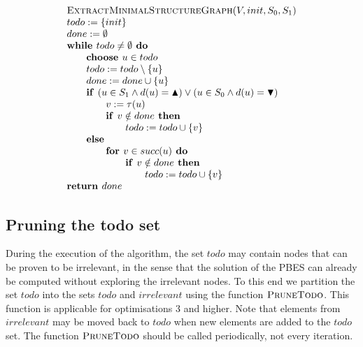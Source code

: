 \documentclass{article}
\newcommand{\If}{\text{\textbf{if }}}
\newcommand{\Do}{\text{\textbf{ do }}}
\newcommand{\Then}{\text{\textbf{ then }}}
\newcommand{\Else}{\text{\textbf{else }}}
\newcommand{\For}{\text{\textbf{for }}}
\newcommand{\While}{\text{\textbf{while }}}
\newcommand{\Choose}{\text{\textbf{choose }}}
\newcommand{\Return}{\text{\textbf{return }}}
\begin{document}
\begin{equation*}
\begin{array}{l}
\textsc{ExtractMinimalStructureGraph}(V,init,S_0,S_1)\\
todo := \{ init \} \\
done := \emptyset \\
\While todo \neq \emptyset \Do \\
\qquad \Choose u \in todo \\
\qquad todo := todo \setminus \{ u \} \\
\qquad done := done \cup \{ u \} \\
\qquad \If (u \in S_1 \land d(u) = \blacktriangle) \lor (u \in S_0 \land d(u) = \blacktriangledown) \\
\qquad \qquad v := \tau(u) \\
\qquad \qquad \If v \notin done \Then \\
\qquad \qquad \qquad todo := todo \cup \{ v \} \\
\qquad \Else \\
\qquad \qquad \For v \in succ(u) \Do \\
\qquad \qquad \qquad \If v \notin done \Then \\
\qquad \qquad \qquad \qquad todo := todo \cup \{ v \} \\
\Return done
\end{array}
\end{equation*}

\subsection{Pruning the todo set}

During the execution of the algorithm, the set $todo$ may contain nodes that can be proven to
be irrelevant, in the sense that the solution of the PBES can already be computed without exploring the irrelevant nodes. To this end we partition the set $todo$ into the sets $todo$ and $irrelevant$ using the function $\textsc{PruneTodo}$. This function is applicable for optimisations 3 and higher. Note that elements from $irrelevant$ may be moved back to $todo$ when new elements are added to the $todo$ set.
The function $\textsc{PruneTodo}$ should be called periodically, not every iteration.
\end{document}
